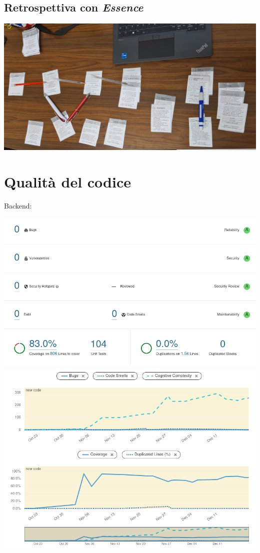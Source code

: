 \documentclass{article}
\begin{document}
\subsection{Retrospettiva con \emph{Essence}}

\includegraphics[width=\textwidth]{essence-4-0}

\section{Qualità del codice}

Backend:

\includegraphics[width=\textwidth]{quality-backend-overall}
\includegraphics[width=\textwidth]{quality-backend-activity}
\end{document}
